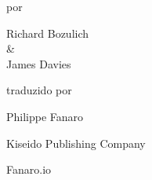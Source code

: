 \documentclass[11pt,twoside,openany,svgnames,x11names]{book}
\begin{document}
\begin{titlepage}
      
      \vspace*{0.2cm}

      \large{por}

      \vspace*{0.125cm}

      \Large{Richard Bozulich}\\
      \normalsize{\&}\\
      \Large{James Davies}

      
      \vfill

      \large{traduzido por}

      \vspace*{0.125cm}

      \Large{Philippe Fanaro}
      

      \vfill
      
      \large{Kiseido Publishing Company}

      \vspace*{0.25cm}
      
      \large{Fanaro.io}
  \end{titlepage}
\end{document}
